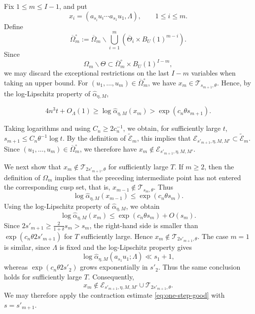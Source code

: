 \documentclass[reqno,11pt]{amsart}
\numberwithin{equation}{section}
\theoremstyle{definition}
\theoremstyle{remark}
\newcommand{\eqlabel}[2]
{
\begin{equation}
{#2}\label{#1}
\end{equation}
}
\begin{document}
\medskip
{}
Fix $1\leq m\leq I-1$, and put
$$
x_i=(a_{s_i}u_i\cdots a_{s_1}u_1,\Lambda),\qquad 1\leq i\leq m.
$$
Define
$$
\overline\Omega_m^{\circ}
:=
\overline\Omega_m\smallsetminus
\bigcup_{i=1}^{m}
\left(\overline\Theta_i\times B_U(1)^{m-i}\right).
$$
Since
$$
\Omega_m\smallsetminus\Theta
\subset
\overline\Omega_m^{\circ}\times B_U(1)^{I-m},
$$
we may discard the exceptional restrictions on the last $I-m$ variables
when taking an upper bound.
For $(u_1,\ldots,u_m)\in\overline\Omega_m^{\circ}$, we have
$x_m\in \mathcal T_{s_{m+1},\theta}$. Hence, by the log-Lipschitz property of $\widehat\alpha_{\eta,M}$,
\eqlabel{eq:alphalowerbound}{4n^3t+O_{\Lambda}(1)
\geq \log\widehat\alpha_{\eta,M}(x_m)
>
\exp(c_n\theta s_{m+1}).}
Taking logarithms and using $C_n\geq 2c_n^{-1}$, we obtain, for sufficiently
large $t$, $s_{m+1}\leq C_n\theta^{-1}\log t$.
By the definition of $\widetilde {\mathcal{E}}_m$, this implies that $\mathcal E_{s'_{m+1},\eta,M,M'}\subset \widetilde{\mathcal{E}}_m$. Since $(u_1,\ldots,u_m)\in\overline\Omega_m^{\circ}$, we therefore have
$x_m\notin \mathcal E_{s'_{m+1},\eta,M,M'}$.

We next show that $x_m\notin \mathcal T_{2s'_{m+1},\theta}$ for sufficiently large $T$. If $m\geq 2$, then the definition of $\Omega_m$ implies that the preceding
intermediate point has not entered the corresponding cusp set, that is, $x_{m-1}\notin \mathcal T_{s_m,\theta}$. Thus
$$
\log\widehat\alpha_{\eta,M}(x_{m-1})
\leq \exp(c_n\theta s_m).
$$
Using the log-Lipschitz property of $\widehat\alpha_{\eta,M}$, we obtain
$$
\log\widehat\alpha_{\eta,M}(x_m)
\leq
\exp(c_n\theta s_m)+O(s_m).
$$
Since $2s'_{m+1}\geq \frac{2}{1+\delta}s_m>s_m$, the right-hand side is smaller than $\exp(c_n\theta 2s'_{m+1})$ for $T$ sufficiently large. Hence $x_m\notin \mathcal T_{2s'_{m+1},\theta}$. The case
$m=1$ is similar, since $\Lambda$ is fixed and the log-Lipschitz property gives
$$
\log\widehat\alpha_{\eta,M}(a_{s_1}u_1;\Lambda)\ll s_1+1,
$$
whereas $\exp(c_n\theta 2s'_2)$ grows exponentially in $s'_2$. Thus the same conclusion holds  for sufficiently large $T$. Consequently, 
$$
x_m\notin \mathcal E_{s'_{m+1},\eta,M,M'}\cup \mathcal T_{2s'_{m+1},\theta}.
$$
We may therefore apply the contraction estimate \eqref{eq:one-step-good} with $s=s'_{m+1}$.
\end{document}
